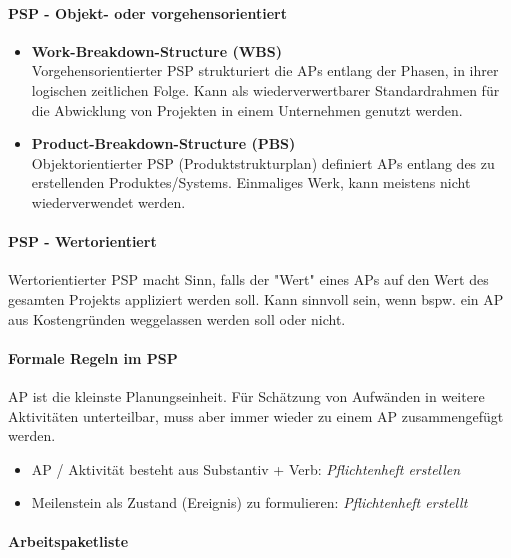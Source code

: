 \documentclass[a4paper]{article}
\begin{document}
			\paragraph{PSP - Objekt- oder vorgehensorientiert}
			
				\begin{itemize}
					\item \textbf{Work-Breakdown-Structure (WBS)}\\
					Vorgehensorientierter PSP strukturiert die APs entlang der Phasen, in ihrer logischen zeitlichen Folge.
					Kann als wiederverwertbarer Standardrahmen für die Abwicklung von Projekten in einem Unternehmen genutzt werden.
					\item \textbf{Product-Breakdown-Structure (PBS)}\\
					Objektorientierter PSP (Produktstrukturplan) definiert APs entlang des zu erstellenden Produktes/Systems.
					Einmaliges Werk, kann meistens nicht wiederverwendet werden.
				\end{itemize}
			
			\paragraph{PSP - Wertorientiert}
			
			Wertorientierter PSP macht Sinn, falls der "Wert" eines APs auf den Wert des gesamten Projekts appliziert werden soll.
			Kann sinnvoll sein, wenn bspw. ein AP aus Kostengründen weggelassen werden soll oder nicht.
			
			\paragraph{Formale Regeln im PSP}
			
			AP ist die kleinste Planungseinheit.
			Für Schätzung von Aufwänden in weitere Aktivitäten unterteilbar, muss aber immer wieder zu einem AP zusammengefügt werden.
			\begin{itemize}
				\item AP / Aktivität besteht aus Substantiv + Verb: \textit{Pflichtenheft erstellen}
				\item Meilenstein als Zustand (Ereignis) zu formulieren: \textit{Pflichtenheft erstellt}
			\end{itemize}
			
			\paragraph{Arbeitspaketliste}
			
\end{document}

